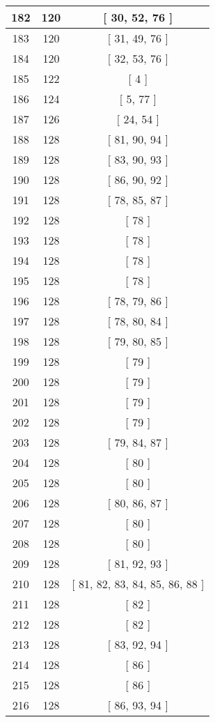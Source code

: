 \begin{center}
\begin{longtable}[H]{|| c c c ||}
\hline
182 & 120 & [ 30, 52, 76 ] \\ 
\hline
183 & 120 & [ 31, 49, 76 ] \\ 
\hline
184 & 120 & [ 32, 53, 76 ] \\ 
\hline
185 & 122 & [ 4 ] \\ 
\hline
186 & 124 & [ 5, 77 ] \\ 
\hline
187 & 126 & [ 24, 54 ] \\ 
\hline
188 & 128 & [ 81, 90, 94 ] \\ 
\hline
189 & 128 & [ 83, 90, 93 ] \\ 
\hline
190 & 128 & [ 86, 90, 92 ] \\ 
\hline
191 & 128 & [ 78, 85, 87 ] \\ 
\hline
192 & 128 & [ 78 ] \\ 
\hline
193 & 128 & [ 78 ] \\ 
\hline
194 & 128 & [ 78 ] \\ 
\hline
195 & 128 & [ 78 ] \\ 
\hline
196 & 128 & [ 78, 79, 86 ] \\ 
\hline
197 & 128 & [ 78, 80, 84 ] \\ 
\hline
198 & 128 & [ 79, 80, 85 ] \\ 
\hline
199 & 128 & [ 79 ] \\ 
\hline
200 & 128 & [ 79 ] \\ 
\hline
201 & 128 & [ 79 ] \\ 
\hline
202 & 128 & [ 79 ] \\ 
\hline
203 & 128 & [ 79, 84, 87 ] \\ 
\hline
204 & 128 & [ 80 ] \\ 
\hline
205 & 128 & [ 80 ] \\ 
\hline
206 & 128 & [ 80, 86, 87 ] \\ 
\hline
207 & 128 & [ 80 ] \\ 
\hline
208 & 128 & [ 80 ] \\ 
\hline
209 & 128 & [ 81, 92, 93 ] \\ 
\hline
210 & 128 & [ 81, 82, 83, 84, 85, 86, 88 ] \\ 
\hline
211 & 128 & [ 82 ] \\ 
\hline
212 & 128 & [ 82 ] \\ 
\hline
213 & 128 & [ 83, 92, 94 ] \\ 
\hline
214 & 128 & [ 86 ] \\ 
\hline
215 & 128 & [ 86 ] \\ 
\hline
216 & 128 & [ 86, 93, 94 ] \\ 

\end{longtable}
\end{center}
